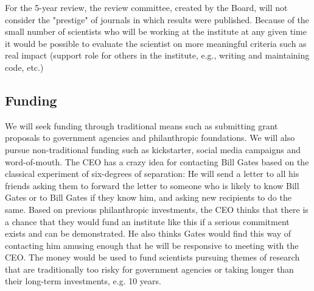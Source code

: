 For the 5-year review, the review committee, created by the Board, will not consider the "prestige" of journals in which results were published. Because of the small number of scientists who will be working at the institute at any given time it would be possible to evaluate the scientist on more meaningful criteria such as real impact (support role for others in the institute, e.g., writing and maintaining code, etc.)

\subsection{Funding}

We will seek funding through traditional means such as submitting grant proposals to government agencies and philanthropic foundations. We will also pursue non-traditional funding such as kickstarter, social media campaigns and word-of-mouth. The CEO has a crazy idea for contacting Bill Gates based on the classical experiment of six-degrees of separation: He will send a letter to all his friends asking them to forward the letter to someone who is likely to know Bill Gates or to Bill Gates if they know him, and asking new recipients to do the same. Based on previous philanthropic investments, the CEO thinks that there is a chance that they would fund an institute like this if a serious commitment exists and can be demonstrated. He also thinks Gates would find this way of contacting him amusing enough that he will be responsive to meeting with the CEO. The money would be used to fund scientists pursuing themes of research that are traditionally too risky for government agencies or taking longer than their long-term investments, e.g. 10 years.
